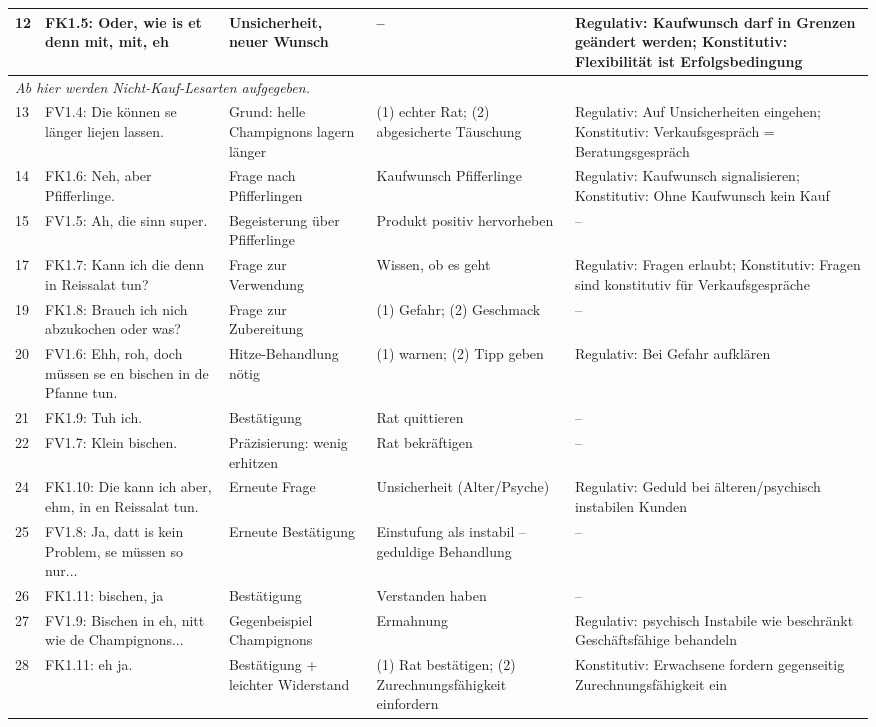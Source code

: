 \documentclass[11pt]{article}
\begin{document}
\begin{longtable}{p{0.8cm}|p{3.5cm}|p{3.5cm}|p{3cm}|p{3cm}}
12 & FK1.5: Oder, wie is et denn mit, mit, eh & Unsicherheit, neuer Wunsch & – & Regulativ: Kaufwunsch darf in Grenzen geändert werden; Konstitutiv: Flexibilität ist Erfolgsbedingung \\
\hline
\multicolumn{5}{l}{\textit{Ab hier werden Nicht-Kauf-Lesarten aufgegeben.}} \\
\hline
13 & FV1.4: Die können se länger liejen lassen. & Grund: helle Champignons lagern länger & (1) echter Rat; (2) abgesicherte Täuschung & Regulativ: Auf Unsicherheiten eingehen; Konstitutiv: Verkaufsgespräch = Beratungsgespräch \\
14 & FK1.6: Neh, aber Pfifferlinge. & Frage nach Pfifferlingen & Kaufwunsch Pfifferlinge & Regulativ: Kaufwunsch signalisieren; Konstitutiv: Ohne Kaufwunsch kein Kauf \\
15 & FV1.5: Ah, die sinn super. & Begeisterung über Pfifferlinge & Produkt positiv hervorheben & – \\
17 & FK1.7: Kann ich die denn in Reissalat tun? & Frage zur Verwendung & Wissen, ob es geht & Regulativ: Fragen erlaubt; Konstitutiv: Fragen sind konstitutiv für Verkaufsgespräche \\
19 & FK1.8: Brauch ich nich abzukochen oder was? & Frage zur Zubereitung & (1) Gefahr; (2) Geschmack & – \\
20 & FV1.6: Ehh, roh, doch müssen se en bischen in de Pfanne tun. & Hitze-Behandlung nötig & (1) warnen; (2) Tipp geben & Regulativ: Bei Gefahr aufklären \\
21 & FK1.9: Tuh ich. & Bestätigung & Rat quittieren & – \\
22 & FV1.7: Klein bischen. & Präzisierung: wenig erhitzen & Rat bekräftigen & – \\
24 & FK1.10: Die kann ich aber, ehm, in en Reissalat tun. & Erneute Frage & Unsicherheit (Alter/Psyche) & Regulativ: Geduld bei älteren/psychisch instabilen Kunden \\
25 & FV1.8: Ja, datt is kein Problem, se müssen so nur... & Erneute Bestätigung & Einstufung als instabil – geduldige Behandlung & – \\
26 & FK1.11: bischen, ja & Bestätigung & Verstanden haben & – \\
27 & FV1.9: Bischen in eh, nitt wie de Champignons... & Gegenbeispiel Champignons & Ermahnung & Regulativ: psychisch Instabile wie beschränkt Geschäftsfähige behandeln \\
28 & FK1.11: eh ja. & Bestätigung + leichter Widerstand & (1) Rat bestätigen; (2) Zurechnungsfähigkeit einfordern & Konstitutiv: Erwachsene fordern gegenseitig Zurechnungsfähigkeit ein \\

\end{longtable}
\end{document}

